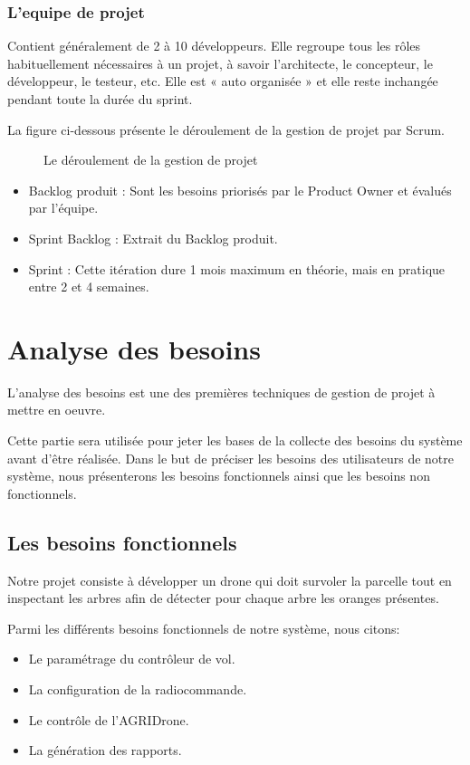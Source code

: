 	\subsubsection{L’equipe de projet  }
	Contient généralement de 2 à 10 développeurs. Elle regroupe tous les rôles habituellement nécessaires à un projet, à savoir l’architecte, le concepteur, le développeur, le testeur, etc. Elle est « auto organisée » et elle reste inchangée pendant toute la durée du sprint.
	
	La figure ci-dessous présente le déroulement de la gestion de projet par Scrum.
	
	\begin{figure} [H]
		\begin{center}
			\centering
		\end{center}
		\caption{Le déroulement de la gestion de projet}
	\end{figure}
	\begin{itemize}
		
		
		\item Backlog produit : Sont les besoins priorisés par le Product Owner et évalués par l’équipe.
		\item Sprint Backlog : Extrait du Backlog produit.
		\item Sprint : Cette itération dure 1 mois maximum en théorie, mais en pratique entre 2 et 4 semaines.
	\end{itemize}
	\section{Analyse des besoins }	
	L'analyse des besoins est une des premières techniques de gestion de projet à mettre en oeuvre.
	
	Cette partie sera utilisée pour jeter les bases de la collecte des besoins du système avant d'être réalisée.
	Dans le but de préciser les besoins des utilisateurs de notre système, nous présenterons les besoins fonctionnels ainsi que les besoins non fonctionnels.
	
	\subsection{Les besoins fonctionnels}
	Notre projet consiste à développer un drone qui doit survoler la parcelle tout en inspectant les arbres afin de détecter pour chaque arbre les oranges présentes.
	
	Parmi les différents besoins fonctionnels de notre système, nous citons:
	\begin{itemize}
		\item Le paramétrage du contrôleur de vol. 
		\item  La configuration de la radiocommande. 
		\item Le contrôle de l'AGRIDrone.
		\item La génération des rapports. 
	\end{itemize} 
	
